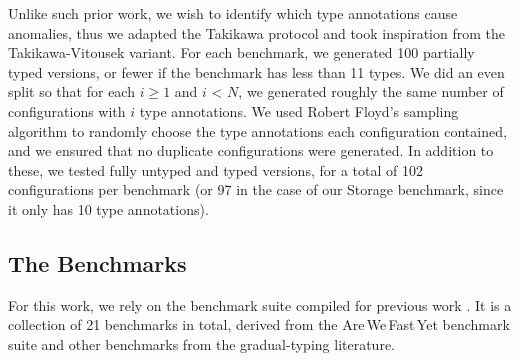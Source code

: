 \documentclass[sigplan,screen]{acmart}
\def\AWFY{Are\,We\,Fast\,Yet\xspace}
\begin{document}

Unlike such prior work, we wish to identify which type annotations cause anomalies,
thus we adapted the Takikawa protocol
and took inspiration from the Takikawa-Vitousek variant.
For each benchmark, we generated 100 partially typed versions,
or fewer if the benchmark has less than 11 types.
We did an even split so that for each $i \ge 1$ and $i$ < $N$, we generated roughly the same number of configurations with $i$ type annotations. We used Robert Floyd's sampling algorithm \cite{Bentley:1987:PPS:30401.315746} to randomly choose the type annotations each configuration contained, and we ensured that no duplicate configurations were generated. In addition to these, we tested fully untyped and typed versions, for a total of 102 configurations per benchmark (or 97 in the case of our Storage benchmark, since it only has 10 type annotations).

\subsection{The Benchmarks}

For this work, we rely on the benchmark suite compiled for previous work
\cite{roberts-and-co-ecoop-2019}.
It is a collection of 21 benchmarks in total,
derived from the \AWFY
benchmark suite \cite{Marr2016} and other benchmarks
from the gradual-typing literature.
\end{document}
